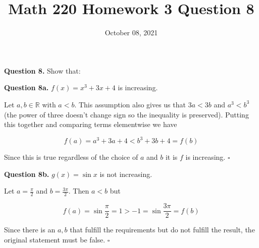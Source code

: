 \documentclass[letterpaper, reqno,11pt]{article}
\newcommand{\RR}{\mathbb{R}}
\begin{document}
\title{Math 220 Homework 3 Question 8}
\date{October 08, 2021}
\maketitle

{\noindent\bf Question 8.} Show that: 

{\noindent\bf Question 8a.} $f(x)=x^3+3x+4$ is increasing. 

\medskip

Let $a, b\in\RR$ with $a<b$. This assumption also gives us that $3a<3b$ and $a^3<b^3$ (the power of three doesn't change sign so the inequality is preserved). Putting this together and comparing terms elementwise we have 

$$
    f(a)=a^3+3a+4 < b^3+3b+4 = f(b)
$$

Since this is true regardless of the choice of $a$ and $b$ it is $f$ is increasing. $\square$

{\noindent\bf Question 8b.} $g(x)=\sin x$ is not increasing. 

\medskip

Let $a=\frac\pi2$ and $b=\frac{3\pi}2$. Then $a<b$ but 

$$
    f(a)=\sin\frac\pi2=1>-1=\sin\frac{3\pi}2=f(b)
$$

Since there is an $a, b$ that fulfill the requirements but do not fulfill the result, the original statement must be false. $\square$
\end{document}
